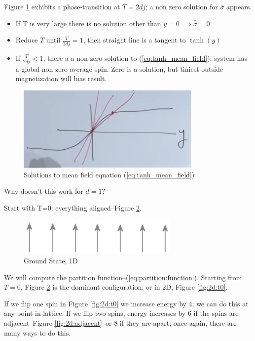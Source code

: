 \documentclass[]{article}
\begin{document}
Figure \ref{fig:tanh_mean_field} exhibits a phase-transition at $T=2dj$; a non zero solution for $\bar{\sigma}$ appears.
\begin{itemize}
	\item If T is very large there is no solution other than $y=0\implies\bar{\bar{\sigma}}=0$
	\item Reduce $T$ until $\frac{T}{2 d j}= 1$, then straight line is a tangent to $\tanh(y)$
	\item If $\frac{T}{2 d j}< 1$, there a a non-zero solution to (\ref{eq:tanh_mean_field}): system has a global non-zero average spin. Zero is a solution, but tiniest outside magnetization will bias result.
\end{itemize}

\begin{figure}[H]
	\caption{Solutions to mean field equation (\ref{eq:tanh_mean_field})}\label{fig:tanh_mean_field}
	\includegraphics[width=0.8\textwidth]{tanh_mean_field}
\end{figure}

Why doesn't this work for $d=1$?

Start with T=0: everything aligned--Figure \ref{fig:T:zero:aligned}.

\begin{figure}[H]
	\centering
	\caption{Ground State, 1D}\label{fig:T:zero:aligned}
	\includegraphics[width=0.7\textwidth]{T_zero_aligned}
\end{figure}

 We will compute the partition function--(\ref{eq:partition:function}). Starting from $T=0$, Figure \ref{fig:T:zero:aligned} is the dominant configuration, or in 2D, Figure \ref{fig:2d:t0}.
 
 If we flip one spin in Figure \ref{fig:2d:t0} we increase energy by 4; we can do this at any point in lattice. If we flip two spins, energy increases by 6 if the spins are adjacent--Figure \ref{fig:2d:adjacent}--or 8 if they are apart; once again, there are many ways to do this.
  
\end{document}
